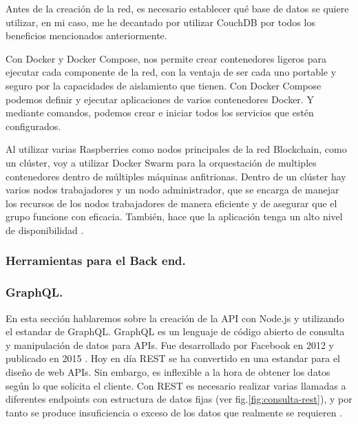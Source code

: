 \vspace{5mm}

\noindent Antes de la creación de la red, es necesario establecer qué base de datos se quiere utilizar, en mi caso, me 
he decantado por utilizar CouchDB por todos los beneficios mencionados anteriormente.

\vspace{5mm}

\noindent Con Docker y Docker Compose, nos permite crear contenedores ligeros para ejecutar cada componente de la red, 
con la ventaja de ser cada uno portable y seguro por la capacidades de aislamiento que tienen. Con Docker Compose 
podemos definir y ejecutar aplicaciones de varios contenedores Docker. Y mediante comandos, podemos crear e iniciar 
todos los servicios que estén configurados.

\vspace{5mm}

\noindent Al utilizar varias Raspberries como nodos principales de la red Blockchain, como un clúster, voy a utilizar 
Docker Swarm para la orquestación de multiples contenedores dentro de múltiples máquinas anfitrionas. Dentro de un 
clúster hay varios nodos trabajadores y un nodo administrador, que se encarga de manejar los recursos de los nodos 
trabajadores de manera eficiente y de asegurar que el grupo funcione con eficacia. También, hace que la aplicación 
tenga un alto nivel de disponibilidad \cite{what-is-docker-swarm}.

\subsubsection{Herramientas para el Back end.}

\subsubsection*{GraphQL.}

En esta sección hablaremos sobre la creación de la API con Node.js y utilizando el estandar de GraphQL. GraphQL es un 
lenguaje de código abierto de consulta y manipulación de datos para APIs. Fue desarrollado por Facebook en 2012 y 
publicado en 2015 \cite{graphql}. Hoy en día REST se ha convertido en una estandar para el diseño de web APIs. Sin 
embargo, es inflexible a la hora de obtener los datos según lo que solicita el cliente. Con REST es necesario realizar 
varias llamadas a diferentes endpoints con estructura de datos fijas (ver fig.\ref{fig:consulta-rest}), y por tanto se 
produce insuficiencia o exceso de los datos que realmente se requieren \cite{graphql-vs-rest}. 

